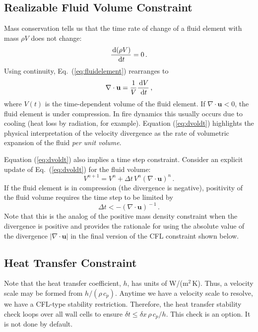 \subsection{Realizable Fluid Volume Constraint}

Mass conservation tells us that the time rate of change of a fluid element with mass $\rho V$ does not change:
\begin{equation}
\label{eq:fluidelement}
\frac{\,\mathrm{d} (\rho V)}{\,\mathrm{d} t} = 0 \,\mbox{.}
\end{equation}
Using continuity, Eq.~(\ref{eq:fluidelement}) rearranges to
\begin{equation}
\label{eq:dvoldt}
\nabla\cdot\mathbf{u} = \frac{1}{V} \frac{\,\mathrm{d} V}{\,\mathrm{d} t} \,\mbox{,}
\end{equation}
where $V(t)$ is the time-dependent volume of the fluid element.  If $\nabla\cdot\mathbf{u}<0$, the fluid element is under compression.  In fire dynamics this usually occurs due to cooling (heat loss by radiation, for example).  Equation (\ref{eq:dvoldt}) highlights the physical interpretation of the velocity divergence as the rate of volumetric expansion of the fluid \emph{per unit volume}.

Equation (\ref{eq:dvoldt}) also implies a time step constraint.  Consider an explicit update of Eq.~(\ref{eq:dvoldt}) for the fluid volume:
\begin{equation}
V^{n+1} = V^n + \Delta t \, V^n (\nabla\cdot\mathbf{u})^{\!n} \,\mbox{.}
\end{equation}
If the fluid element is in compression (the divergence is negative), positivity of the fluid volume requires the time step to be limited by
\begin{equation}
\label{eq:volumedtrestriction}
\Delta t < -(\nabla\cdot\mathbf{u})^{\!-1} \,\mbox{.}
\end{equation}
Note that this is the analog of the positive mass density constraint when the divergence is positive and provides the rationale for using the absolute value of the divergence $|\nabla\cdot\mathbf{u}|$ in the final version of the CFL constraint shown below.

\subsection{Heat Transfer Constraint}

Note that the heat transfer coefficient, $h$, has units of W/(m$^2$\,K).  Thus, a velocity scale may be formed from $h/(\rho\, c_p)$.  Anytime we have a velocity scale to resolve, we have a CFL-type stability restriction.  Therefore, the heat transfer stability check loops over all wall cells to ensure $\delta t \le \delta x \,\rho \,c_p/h$.  This check is an option. It is not done by default.

